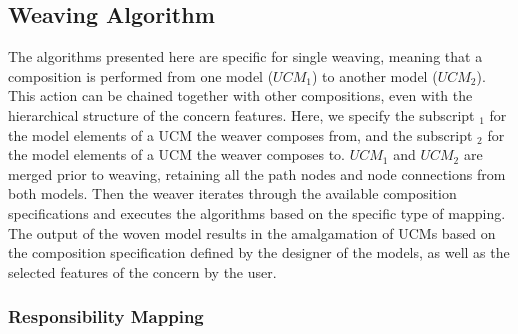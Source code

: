 \subsection{Weaving Algorithm}

The algorithms presented here are specific for single weaving, meaning that a composition is performed from one model ($UCM_1$) to another model ($UCM_2$). This action can be chained together with other compositions, even with the hierarchical structure of the concern features. Here, we specify the subscript $_1$ for the model elements of a UCM the weaver composes from, and the subscript $_2$ for the model elements of a UCM the weaver composes to. $UCM_1$ and $UCM_2$ are merged prior to weaving, retaining all the path nodes and node connections from both models. Then the weaver iterates through the available composition specifications and executes the algorithms based on the specific type of mapping. The output of the woven model results in the amalgamation of UCMs based on the composition specification defined by the designer of the models, as well as the selected features of the concern by the user.

\subsubsection{Responsibility Mapping} \label{sec:3.2.1.1}


